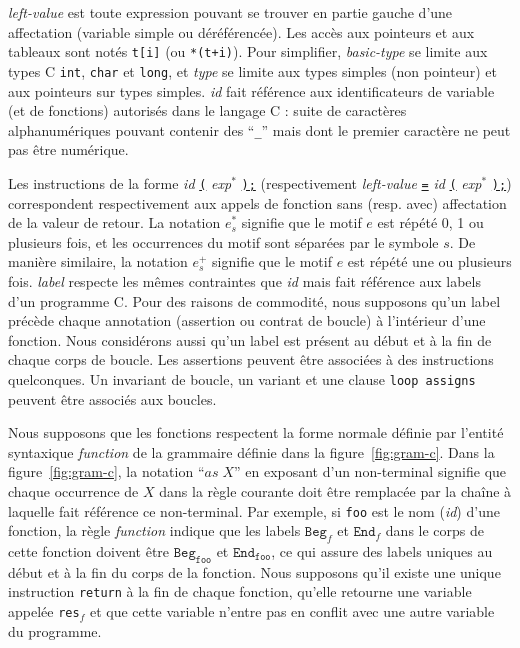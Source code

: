 \textit{left-value} est toute expression pouvant se trouver en
partie gauche d'une affectation (variable simple ou déréférencée).
Les accès aux pointeurs et aux tableaux sont notés \lstinline't[i]' (ou
\lstinline'*(t+i)').
Pour simplifier, \textit{basic-type} se limite aux types C \lstinline'int',
\lstinline'char' et \lstinline'long', et \textit{type} se limite aux types
simples (non pointeur) et aux pointeurs sur types simples.
\textit{id} fait référence aux identificateurs de variable (et de fonctions)
autorisés dans le langage C : suite de caractères alphanumériques pouvant
contenir des ``\lstinline'_''' mais dont le premier caractère ne peut pas être
numérique.

Les instructions de la forme \textit{id} \underline{\lstinline'('}
\textit{exp}$^{*}$ \underline{\lstinline');'} (respectivement
\textit{left-value} \underline{\lstinline'='} \textit{id}
\underline{\lstinline'('} \textit{exp}$^{*}$ \underline{\lstinline');'})
correspondent respectivement aux appels de fonction sans (resp. avec)
affectation de la valeur de retour.
La notation $e^*_s$ signifie que le motif $e$ est répété 0, 1 ou plusieurs fois,
et les occurrences du motif sont séparées par le symbole $s$.
De manière similaire, la notation $e^+_s$ signifie que le motif $e$ est répété
une ou plusieurs fois. 
\textit{label} respecte les mêmes contraintes que \textit{id} mais fait
référence aux labels d'un programme C.
Pour des raisons de commodité, nous supposons qu'un label précède chaque
annotation (assertion ou contrat de boucle) à l'intérieur d'une fonction.
Nous considérons aussi qu'un label est présent au début et à la fin de chaque
corps de boucle.
Les assertions peuvent être associées à des instructions quelconques.
Un invariant de boucle, un variant et une clause \lstinline'loop assigns'
peuvent être associés aux boucles.

Nous supposons que les fonctions respectent la forme normale définie par
l'entité syntaxique \textit{function} de la grammaire définie dans la
figure~\ref{fig:gram-c}.
Dans la figure~\ref{fig:gram-c}, la notation ``${\textit{as}\;X}$'' en exposant
d'un non-terminal signifie que chaque occurrence de $X$ dans la règle courante
doit être remplacée par la chaîne à laquelle fait référence ce non-terminal.
Par exemple, si \texttt{foo} est le nom (\textit{id}) d'une fonction,
la règle \textit{function} indique que les labels $\texttt{Beg}_f$ et
$\texttt{End}_f$ dans le corps de cette fonction doivent être
$\texttt{Beg}_{\texttt{foo}}$ et $\texttt{End}_{\texttt{foo}}$, ce qui assure des
labels uniques au début et à la fin du corps de la fonction.
Nous supposons qu'il existe une unique instruction \lstinline'return' à la fin
de chaque fonction, qu'elle retourne une variable appelée \lstinline'res'$_f$ et
que cette variable n'entre pas en conflit avec une autre variable du programme.

